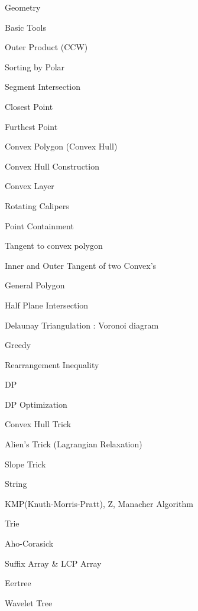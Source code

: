 \documentclass[portrait, 8pt, a4paper, oneside, twocolumn]{extarticle}
\begin{document}
\begin{tcolorbox}[breakable, enhanced, sharp corners, colback=white, colframe=black, boxrule=1pt, left=0pt]
\begin{IdeaNote}
\item Geometry
    \begin{IdeaNote}
    \item Basic Tools
        \begin{IdeaNote}
        \item Outer Product (CCW)
        \item Sorting by Polar
        \item Segment Intersection
        \item Closest Point
        \item Furthest Point
        \end{IdeaNote}
    \item Convex Polygon (Convex Hull)
        \begin{IdeaNote}
        \item Convex Hull Construction
        \item Convex Layer
        \item Rotating Calipers
        \item Point Containment
        \item Tangent to convex polygon
        \item Inner and Outer Tangent of two Convex's
        \end{IdeaNote}
    \item General Polygon
    \item Half Plane Intersection
    \item Delaunay Triangulation : Voronoi diagram
    \end{IdeaNote}


\item Greedy
    \begin{IdeaNote}
    \item Rearrangement Inequality
    \end{IdeaNote}

\item DP
    \begin{IdeaNote}
    \item DP Optimization
        \begin{IdeaNote}
        \item Convex Hull Trick
        \item Alien's Trick (Lagrangian Relaxation)
        \item Slope Trick
        \end{IdeaNote}
    \end{IdeaNote}

\item String
    \begin{IdeaNote}
    \item KMP(Knuth-Morris-Pratt), Z, Manacher Algorithm
    \item Trie
    \item Aho-Corasick
    \item Suffix Array \& LCP Array
    \item Eertree
    \item Wavelet Tree
    \end{IdeaNote}


\end{IdeaNote}
\end{tcolorbox}
\end{document}
